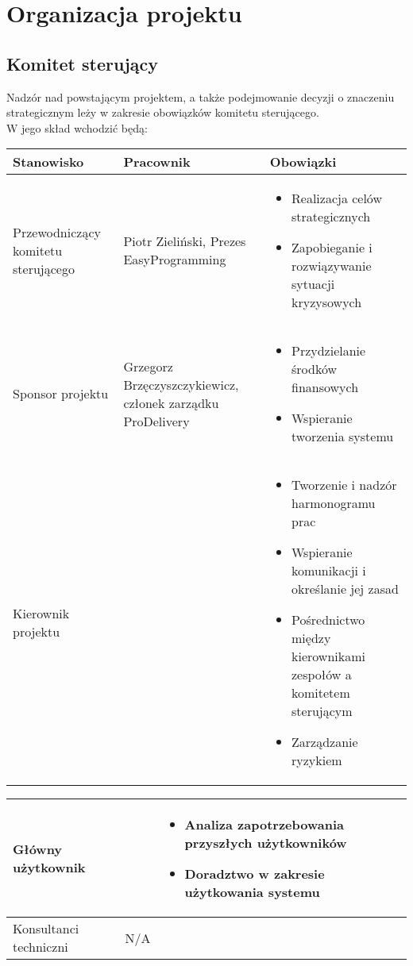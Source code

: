 \documentclass[11pt]{article}
\begin{document}
\newpage
\section{Organizacja projektu}
\subsection{Komitet sterujący}
Nadzór nad powstającym projektem, a także podejmowanie decyzji o znaczeniu strategicznym leży w zakresie obowiązków komitetu sterującego.\\
W jego skład wchodzić będą:\\

\begin{tabular}{|p{4.5cm}|p{4.5cm}|p{4.5cm}|} \hline
Stanowisko & Pracownik & Obowiązki \\
\hline \hline
Przewodniczący komitetu sterującego & Piotr Zieliński, Prezes EasyProgramming & 
\begin{itemize}
\item Realizacja celów strategicznych
\item Zapobieganie i rozwiązywanie sytuacji kryzysowych
\end{itemize}\\
\hline
Sponsor projektu & Grzegorz Brzęczyszczykiewicz, członek zarządku ProDelivery &
\begin{itemize}
\item Przydzielanie środków finansowych
\item Wspieranie tworzenia systemu
\end{itemize}\\
\hline
Kierownik projektu & & 
\begin{itemize}
\item Tworzenie i nadzór harmonogramu prac
\item Wspieranie komunikacji i określanie jej zasad 
\item Pośrednictwo między kierownikami zespołów a komitetem sterującym
\item Zarządzanie ryzykiem
\end{itemize}\\
 \hline
\end{tabular}
\newpage
\begin{tabular}{|p{4.5cm}|p{4.5cm}|p{4.5cm}|} \hline
Główny użytkownik & & 
\begin{itemize}
\item Analiza zapotrzebowania przyszłych użytkowników
\item Doradztwo w zakresie użytkowania systemu
\end{itemize}\\
 \hline
Konsultanci techniczni & N/A & \\
 \hline
\end{tabular}
\end{document}
